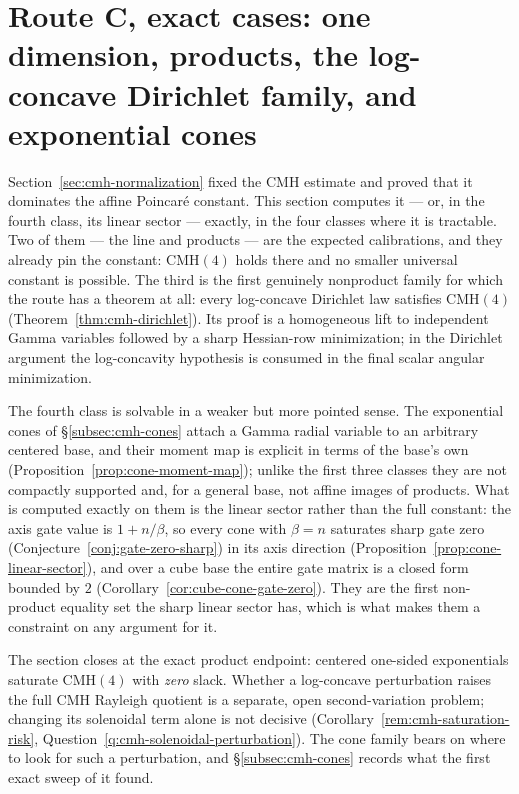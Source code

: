 \documentclass[../../main.tex]{subfiles}
\begin{document}
\section{Route C, exact cases: one dimension, products, the log-concave Dirichlet family, and
exponential cones}
\label{sec:cmh-exact-cases}

Section~\ref{sec:cmh-normalization} fixed the CMH estimate and proved that it dominates the
affine Poincar\'e constant. This section computes it --- or, in the fourth class, its linear
sector --- exactly, in the four classes where it is
tractable. Two of them --- the line and products --- are the expected calibrations, and they
already pin the constant: $\mathrm{CMH}(4)$ holds there and no smaller universal constant is
possible. The third is the first genuinely nonproduct family for which the route has a theorem
at all: every log-concave Dirichlet law satisfies $\mathrm{CMH}(4)$
(Theorem~\ref{thm:cmh-dirichlet}). Its proof is a homogeneous lift to independent Gamma
variables followed by a sharp Hessian-row minimization; in the Dirichlet argument the
log-concavity hypothesis is consumed in the final scalar angular minimization.

The fourth class is solvable in a weaker but more pointed sense. The exponential cones of
\S\ref{subsec:cmh-cones} attach a Gamma radial variable to an arbitrary centered base, and
their moment map is explicit in terms of the base's own
(Proposition~\ref{prop:cone-moment-map}); unlike the first three classes they are not compactly
supported and, for a general base, not affine images of products. What is computed exactly on
them is the linear sector rather than the full constant: the axis gate value is $1+n/\beta$, so
every cone with $\beta=n$ saturates sharp gate zero
(Conjecture~\ref{conj:gate-zero-sharp}) in its axis direction
(Proposition~\ref{prop:cone-linear-sector}), and over a cube base the entire gate matrix is a
closed form bounded by $2$ (Corollary~\ref{cor:cube-cone-gate-zero}). They are the first
non-product equality set the sharp linear sector has, which is what makes them a constraint on
any argument for it.

The section closes at the exact product endpoint: centered one-sided exponentials saturate
$\mathrm{CMH}(4)$ with \emph{zero} slack. Whether a log-concave perturbation raises the full CMH
Rayleigh quotient is a separate, open second-variation problem; changing its solenoidal term
alone is not decisive (Corollary~\ref{rem:cmh-saturation-risk},
Question~\ref{q:cmh-solenoidal-perturbation}). The cone family bears on where to look for such a
perturbation, and \S\ref{subsec:cmh-cones} records what the first exact sweep of it found.
\end{document}
